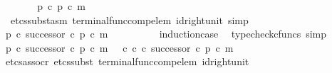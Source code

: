 \begin{isabellebody}
\ \ \ \ \isamarkupfalse%
\ \isamarkupfalse%
\ {\isachardoublequoteopen}p\ {\isasymcirc}\isactrlsub c\ p{\isacharprime}{\kern0pt}\ {\isasymcirc}\isactrlsub c\ m\ {\isacharequal}{\kern0pt}\ {\isasymt}{\isachardoublequoteclose}\isanewline
\ \ \ \ \ \ \isamarkupfalse%
\ {\isacharparenleft}{\kern0pt}{\isacharminus}{\kern0pt}{\isacharcomma}{\kern0pt}\ etcs{\isacharunderscore}{\kern0pt}subst{\isacharunderscore}{\kern0pt}asm\ terminal{\isacharunderscore}{\kern0pt}func{\isacharunderscore}{\kern0pt}comp{\isacharunderscore}{\kern0pt}elem\ id{\isacharunderscore}{\kern0pt}right{\isacharunderscore}{\kern0pt}unit{}{\isacharcomma}{\kern0pt}\ simp{\isacharparenright}{\kern0pt}\isanewline
\ \ \ \ \isamarkupfalse%
\ \isamarkupfalse%
\ {\isachardoublequoteopen}p\ {\isasymcirc}\isactrlsub c\ successor\ {\isasymcirc}\isactrlsub c\ p{\isacharprime}{\kern0pt}\ {\isasymcirc}\isactrlsub c\ m\ {\isacharequal}{\kern0pt}\ {\isasymt}{\isachardoublequoteclose}\isanewline
\ \ \ \ \ \ \isamarkupfalse%
\ induction{\isacharunderscore}{\kern0pt}case\ \isamarkupfalse%
\ {\isacharparenleft}{\kern0pt}typecheck{\isacharunderscore}{\kern0pt}cfuncs{\isacharcomma}{\kern0pt}\ simp{\isacharparenright}{\kern0pt}\isanewline
\ \ \ \ \isamarkupfalse%
\ \isamarkupfalse%
\ {\isachardoublequoteopen}{\isacharparenleft}{\kern0pt}p\ {\isasymcirc}\isactrlsub c\ successor\ {\isasymcirc}\isactrlsub c\ p{\isacharprime}{\kern0pt}{\isacharparenright}{\kern0pt}\ {\isasymcirc}\isactrlsub c\ m\ {\isacharequal}{\kern0pt}\ {\isacharparenleft}{\kern0pt}{\isacharparenleft}{\kern0pt}{\isasymt}\ {\isasymcirc}\isactrlsub c\ {\isasymbeta}\isactrlbsub {\isasymnat}\isactrlsub c\isactrlesub {\isacharparenright}{\kern0pt}\ {\isasymcirc}\isactrlsub c\ successor\ {\isasymcirc}\isactrlsub c\ p{\isacharprime}{\kern0pt}{\isacharparenright}{\kern0pt}\ {\isasymcirc}\isactrlsub c\ m{\isachardoublequoteclose}\isanewline
\ \ \ \ \ \ \isamarkupfalse%
\ {\isacharparenleft}{\kern0pt}etcs{\isacharunderscore}{\kern0pt}assocr{\isacharcomma}{\kern0pt}\ etcs{\isacharunderscore}{\kern0pt}subst\ terminal{\isacharunderscore}{\kern0pt}func{\isacharunderscore}{\kern0pt}comp{\isacharunderscore}{\kern0pt}elem\ id{\isacharunderscore}{\kern0pt}right{\isacharunderscore}{\kern0pt}unit{}{\isacharcomma}{\kern0pt}\ {\isacharminus}{\kern0pt}{\isacharparenright}{\kern0pt}\isanewline
\ \ \isamarkupfalse%
\isanewline
\ \ \isamarkupfalse%
\ \isamarkupfalse%

\end{isabellebody}
